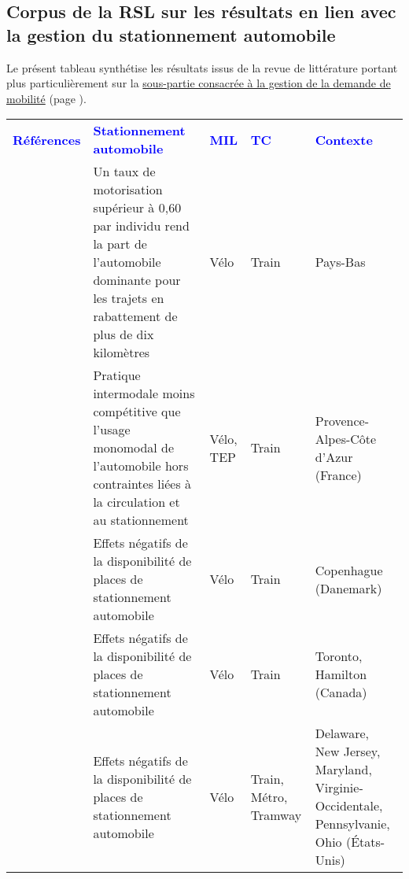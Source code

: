     \newpage
\subsection{Corpus de la \acrshort{RSL} sur les résultats en lien avec la gestion du stationnement automobile}
    \label{donnees-ouvertes:rsl_resultats_stationnement_automobile}

Le présent tableau synthétise les résultats issus de la revue de littérature portant plus particulièrement sur la \hyperref[Gestion de la demande de mobilité]{sous-partie consacrée à la gestion de la demande de mobilité} (page \pageref{Gestion de la demande de mobilité}).\par
  
        \begin{longtable}{p{3cm}p{4cm}p{1.5cm}p{1.8cm}p{2.3cm}}
        \hline
        \textcolor{blue}{\textbf{Références}} & \textcolor{blue}{\textbf{Stationnement automobile}} & \textcolor{blue}{\textbf{MIL}} & \textcolor{blue}{\textbf{TC}} & \textcolor{blue}{\textbf{Contexte}}
        \hline
        \endhead
\multicolumn{5}{l}{\textbf{}}\\
    \small{\textcite{debrezion_modelling_2009}}\index{Debrezion, Ghebreegziabiher|pagebf} & \small{Un taux de motorisation supérieur à 0,60 par individu rend la part de l'automobile dominante pour les trajets en \gls{rabattement} de plus de dix kilomètres} & \small{Vélo} & \small{Train} & \small{Pays-Bas}\\
    \small{\textcite{moinse_intermodal_2022}}\index{Moinse, Dylan|pagebf} & \small{Pratique intermodale moins compétitive que l'usage monomodal de l'automobile hors contraintes liées à la circulation et au stationnement} & \small{Vélo, TEP} & \small{Train} & \small{Provence-Alpes-Côte d'Azur (France)}\\
    \small{\textcite{halldorsdottir_home-end_2017}}\index{Halldórsdóttir, Katrín|pagebf} & \small{Effets négatifs de la disponibilité de places de stationnement automobile} & \small{Vélo} & \small{Train} & \small{Copenhague (Danemark)}\\
    \small{\textcite{chan_factors_2020}}\index{Chan, Kevin|pagebf} & \small{Effets négatifs de la disponibilité de places de stationnement automobile} & \small{Vélo} & \small{Train} & \small{Toronto, Hamilton (Canada)}\\ 
    \small{\textcite{bopp_examining_2015}}\index{Bopp, Melissa|pagebf} & \small{Effets négatifs de la disponibilité de places de stationnement automobile} & \small{Vélo} & \small{Train, Métro, Tramway} & \small{Delaware, New Jersey, Maryland, Virginie-Occidentale, Pennsylvanie, Ohio (États-Unis)}\\

\end{longtable}
